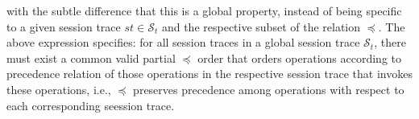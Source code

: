 \documentclass[journal,compsoc]{IEEEtran}
\begin{document}
with the subtle difference that this is a global property, instead of being specific to a given session trace $\mathit{st} \in \mathcal{S}_t$ and the respective subset of the relation $\preccurlyeq$. The above expression specifies: for  all session traces in a global session trace $\mathcal{S}_t$, there must exist a common valid partial $\preccurlyeq$ order that orders operations according to precedence relation of those operations in the respective session trace that invokes these operations, i.e., $\preccurlyeq$ preserves precedence among operations with respect to each corresponding seession trace.

%
\end{document}

